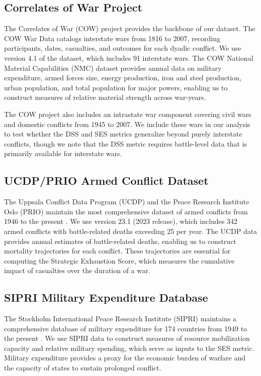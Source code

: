 \subsection{Correlates of War Project}

The Correlates of War (COW) project provides the backbone of our dataset. The COW War Data \citep{singer1972} catalogs interstate wars from 1816 to 2007, recording participants, dates, casualties, and outcomes for each dyadic conflict. We use version 4.1 of the dataset, which includes 91 interstate wars. The COW National Material Capabilities (NMC) dataset \citep{singer1972b} provides annual data on military expenditure, armed forces size, energy production, iron and steel production, urban population, and total population for major powers, enabling us to construct measures of relative material strength across war-years.

The COW project also includes an intrastate war component covering civil wars and domestic conflicts from 1945 to 2007. We include these wars in our analysis to test whether the DSS and SES metrics generalize beyond purely interstate conflicts, though we note that the DSS metric requires battle-level data that is primarily available for interstate wars.

\subsection{UCDP/PRIO Armed Conflict Dataset}

The Uppsala Conflict Data Program (UCDP) and the Peace Research Institute Oslo (PRIO) maintain the most comprehensive dataset of armed conflicts from 1946 to the present \citep{gleditsch2002}. We use version 23.1 (2023 release), which includes 342 armed conflicts with battle-related deaths exceeding 25 per year. The UCDP data provides annual estimates of battle-related deaths, enabling us to construct mortality trajectories for each conflict. These trajectories are essential for computing the Strategic Exhaustion Score, which measures the cumulative impact of casualties over the duration of a war.

\subsection{SIPRI Military Expenditure Database}

The Stockholm International Peace Research Institute (SIPRI) maintains a comprehensive database of military expenditure for 174 countries from 1949 to the present \citep{sipri2023}. We use SIPRI data to construct measures of resource mobilization capacity and relative military spending, which serve as inputs to the SES metric. Military expenditure provides a proxy for the economic burden of warfare and the capacity of states to sustain prolonged conflict.

